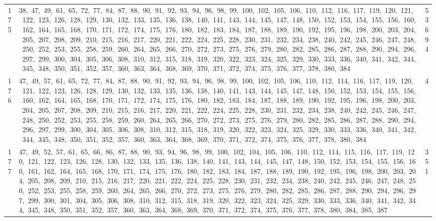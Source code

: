 \begin{longtable}{c|p{}|r}
175 & 38,\ 47,\ 49,\ 61,\ 65,\ 72,\ 77,\ 84,\ 87,\ 88,\ 90,\ 91,\ 92,\ 93,\ 94,\ 96,\ 98,\ 99,\ 100,\ 102,\ 105,\ 106,\ 110,\ 112,\ 116,\ 117,\ 119,\ 120,\ 121,\ 122,\ 123,\ 126,\ 128,\ 129,\ 130,\ 132,\ 133,\ 135,\ 136,\ 138,\ 140,\ 141,\ 143,\ 144,\ 145,\ 147,\ 148,\ 150,\ 152,\ 153,\ 154,\ 155,\ 156,\ 160,\ 162,\ 164,\ 165,\ 168,\ 170,\ 171,\ 172,\ 174,\ 175,\ 176,\ 180,\ 182,\ 183,\ 184,\ 187,\ 188,\ 189,\ 190,\ 192,\ 195,\ 196,\ 198,\ 200,\ 203,\ 204,\ 205,\ 207,\ 208,\ 209,\ 210,\ 215,\ 216,\ 217,\ 220,\ 221,\ 222,\ 224,\ 225,\ 228,\ 230,\ 231,\ 232,\ 234,\ 238,\ 240,\ 242,\ 245,\ 246,\ 247,\ 248,\ 250,\ 252,\ 253,\ 255,\ 258,\ 259,\ 260,\ 264,\ 265,\ 266,\ 270,\ 272,\ 273,\ 275,\ 276,\ 279,\ 280,\ 282,\ 285,\ 286,\ 287,\ 288,\ 290,\ 294,\ 296,\ 297,\ 299,\ 300,\ 304,\ 305,\ 306,\ 308,\ 310,\ 312,\ 315,\ 318,\ 319,\ 320,\ 322,\ 323,\ 324,\ 325,\ 329,\ 330,\ 333,\ 336,\ 340,\ 341,\ 342,\ 344,\ 345,\ 348,\ 350,\ 351,\ 352,\ 357,\ 360,\ 363,\ 364,\ 368,\ 369,\ 370,\ 371,\ 372,\ 374,\ 375,\ 376,\ 377,\ 378,\ 380,\ 384 & 53694 \\
176 & 47,\ 49,\ 57,\ 61,\ 65,\ 72,\ 77,\ 84,\ 87,\ 88,\ 90,\ 91,\ 92,\ 93,\ 94,\ 96,\ 98,\ 99,\ 100,\ 102,\ 105,\ 106,\ 110,\ 112,\ 114,\ 116,\ 117,\ 119,\ 120,\ 121,\ 122,\ 123,\ 126,\ 128,\ 129,\ 130,\ 132,\ 133,\ 135,\ 136,\ 138,\ 140,\ 141,\ 143,\ 144,\ 145,\ 147,\ 148,\ 150,\ 152,\ 153,\ 154,\ 155,\ 156,\ 160,\ 162,\ 164,\ 165,\ 168,\ 170,\ 171,\ 172,\ 174,\ 175,\ 176,\ 180,\ 182,\ 183,\ 184,\ 187,\ 188,\ 189,\ 190,\ 192,\ 195,\ 196,\ 198,\ 200,\ 203,\ 204,\ 205,\ 207,\ 208,\ 209,\ 210,\ 215,\ 216,\ 217,\ 220,\ 221,\ 222,\ 224,\ 225,\ 228,\ 230,\ 231,\ 232,\ 234,\ 238,\ 240,\ 242,\ 245,\ 246,\ 247,\ 248,\ 250,\ 252,\ 253,\ 255,\ 258,\ 259,\ 260,\ 264,\ 265,\ 266,\ 270,\ 272,\ 273,\ 275,\ 276,\ 279,\ 280,\ 282,\ 285,\ 286,\ 287,\ 288,\ 290,\ 294,\ 296,\ 297,\ 299,\ 300,\ 304,\ 305,\ 306,\ 308,\ 310,\ 312,\ 315,\ 318,\ 319,\ 320,\ 322,\ 323,\ 324,\ 325,\ 329,\ 330,\ 333,\ 336,\ 340,\ 341,\ 342,\ 344,\ 345,\ 348,\ 350,\ 351,\ 352,\ 357,\ 360,\ 363,\ 364,\ 368,\ 369,\ 370,\ 371,\ 372,\ 374,\ 375,\ 376,\ 377,\ 378,\ 380,\ 384 & 4 \\
177 & 47,\ 49,\ 52,\ 57,\ 61,\ 65,\ 66,\ 86,\ 87,\ 88,\ 90,\ 93,\ 94,\ 96,\ 98,\ 99,\ 100,\ 102,\ 104,\ 105,\ 106,\ 110,\ 112,\ 114,\ 115,\ 116,\ 117,\ 119,\ 120,\ 121,\ 122,\ 123,\ 126,\ 128,\ 130,\ 132,\ 133,\ 135,\ 136,\ 138,\ 140,\ 141,\ 143,\ 144,\ 145,\ 147,\ 148,\ 150,\ 152,\ 153,\ 154,\ 155,\ 156,\ 160,\ 161,\ 162,\ 164,\ 165,\ 168,\ 170,\ 171,\ 174,\ 175,\ 176,\ 180,\ 182,\ 183,\ 184,\ 187,\ 188,\ 189,\ 190,\ 192,\ 195,\ 196,\ 198,\ 200,\ 203,\ 204,\ 205,\ 208,\ 209,\ 210,\ 215,\ 216,\ 217,\ 220,\ 221,\ 222,\ 224,\ 225,\ 228,\ 230,\ 231,\ 232,\ 234,\ 238,\ 240,\ 242,\ 245,\ 246,\ 247,\ 248,\ 250,\ 252,\ 253,\ 255,\ 258,\ 259,\ 260,\ 264,\ 265,\ 266,\ 270,\ 272,\ 273,\ 275,\ 276,\ 279,\ 280,\ 282,\ 285,\ 286,\ 287,\ 288,\ 290,\ 294,\ 296,\ 297,\ 299,\ 300,\ 301,\ 304,\ 305,\ 306,\ 308,\ 310,\ 312,\ 315,\ 318,\ 319,\ 320,\ 322,\ 323,\ 324,\ 325,\ 329,\ 330,\ 333,\ 336,\ 340,\ 341,\ 342,\ 344,\ 345,\ 348,\ 350,\ 351,\ 352,\ 357,\ 360,\ 363,\ 364,\ 368,\ 369,\ 370,\ 371,\ 372,\ 374,\ 375,\ 376,\ 377,\ 378,\ 380,\ 384,\ 385,\ 387 & 351 \\

\end{longtable}

